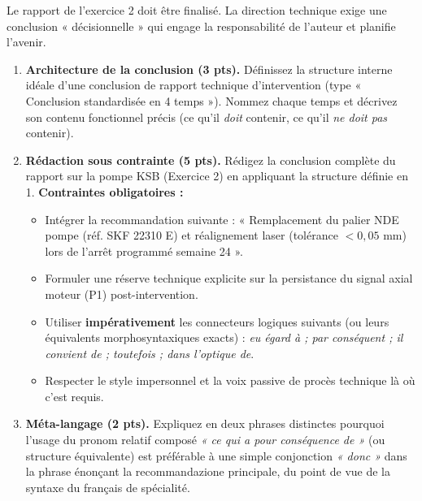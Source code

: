 \documentclass[11pt]{article}
\begin{document}
\begin{exercice}
Le rapport de l'exercice 2 doit être finalisé. La direction technique exige une conclusion « décisionnelle » qui engage la responsabilité de l'auteur et planifie l'avenir.

\begin{enumerate}
    \item \textbf{Architecture de la conclusion (3 pts).} Définissez la structure interne idéale d'une conclusion de rapport technique d'intervention (type « Conclusion standardisée en 4 temps »). Nommez chaque temps et décrivez son contenu fonctionnel précis (ce qu'il \textit{doit} contenir, ce qu'il \textit{ne doit pas} contenir).
    \item \textbf{Rédaction sous contrainte (5 pts).} Rédigez la conclusion complète du rapport sur la pompe KSB (Exercice 2) en appliquant la structure définie en 1.
    \textbf{Contraintes obligatoires :}
    \begin{itemize}
        \item Intégrer la recommandation suivante : « Remplacement du palier NDE pompe (réf. SKF 22310 E) et réalignement laser (tolérance $< 0,05$ mm) lors de l'arrêt programmé semaine 24 ».
        \item Formuler une réserve technique explicite sur la persistance du signal axial moteur (P1) post-intervention.
        \item Utiliser \textbf{impérativement} les connecteurs logiques suivants (ou leurs équivalents morphosyntaxiques exacts) : \textit{eu égard à ; par conséquent ; il convient de ; toutefois ; dans l'optique de}.
        \item Respecter le style impersonnel et la voix passive de procès technique là où c'est requis.
    \end{itemize}
    \item \textbf{Méta-langage (2 pts).} Expliquez en deux phrases distinctes pourquoi l'usage du pronom relatif composé \textit{« ce qui a pour conséquence de »} (ou structure équivalente) est préférable à une simple conjonction \textit{« donc »} dans la phrase énonçant la recommandazione principale, du point de vue de la syntaxe du français de spécialité.
\end{enumerate}
\end{exercice}
\end{document}
